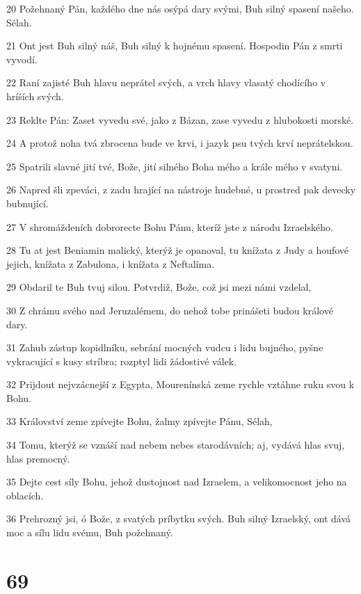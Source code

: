 \par 20 Požehnaný Pán, každého dne nás osýpá dary svými, Buh silný spasení našeho. Sélah.
\par 21 Ont jest Buh silný náš, Buh silný k hojnému spasení. Hospodin Pán z smrti vyvodí.
\par 22 Raní zajisté Buh hlavu neprátel svých, a vrch hlavy vlasatý chodícího v hríších svých.
\par 23 Reklte Pán: Zaset vyvedu své, jako z Bázan, zase vyvedu z hlubokosti morské.
\par 24 A protož noha tvá zbrocena bude ve krvi, i jazyk psu tvých krví neprátelskou.
\par 25 Spatrili slavné jití tvé, Bože, jití silného Boha mého a krále mého v svatyni.
\par 26 Napred šli zpeváci, z zadu hrající na nástroje hudebné, u prostred pak devecky bubnující.
\par 27 V shromáždeních dobrorecte Bohu Pánu, kteríž jste z národu Izraelského.
\par 28 Tu at jest Beniamin malický, kterýž je opanoval, tu knížata z Judy a houfové jejich, knížata z Zabulona, i knížata z Neftalíma.
\par 29 Obdaril te Buh tvuj silou. Potvrdiž, Bože, což jsi mezi námi vzdelal,
\par 30 Z chrámu svého nad Jeruzalémem, do nehož tobe prinášeti budou králové dary.
\par 31 Zahub zástup kopidlníku, sebrání mocných vudcu i lidu bujného, pyšne vykracující s kusy stríbra; rozptyl lidi žádostivé válek.
\par 32 Prijdout nejvzácnejší z Egypta, Mourenínská zeme rychle vztáhne ruku svou k Bohu.
\par 33 Království zeme zpívejte Bohu, žalmy zpívejte Pánu, Sélah,
\par 34 Tomu, kterýž se vznáší nad nebem nebes starodávních; aj, vydává hlas svuj, hlas premocný.
\par 35 Dejte cest síly Bohu, jehož dustojnost nad Izraelem, a velikomocnost jeho na oblacích.
\par 36 Prehrozný jsi, ó Bože, z svatých príbytku svých. Buh silný Izraelský, ont dává moc a sílu lidu svému, Buh požehnaný.

\chapter{69}

